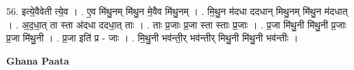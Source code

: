 \documentclass[17pt]{extarticle}
\begin{document}
56. इत्ये॒वैवेती त्ये॒व । . ए॒व मि॑थु॒नम् मि॑थु॒न मे॒वैव मि॑थु॒नम् । . मि॒थु॒न म॑दधा ददधान् मिथु॒नम् मि॑थु॒न म॑दधात् । . अ॒द॒धा॒त् ता स्ता अ॑दधा ददधा॒त् ताः । . ताः प्र॒जाः प्र॒जा स्ता स्ताः प्र॒जाः । . प्र॒जा मि॑थु॒नी मि॑थु॒नी प्र॒जाः प्र॒जा मि॑थु॒नी । . प्र॒जा इति॑ प्र - जाः । . मि॒थु॒नी भव॑न्ती॒र् भव॑न्तीर् मिथु॒नी मि॑थु॒नी भव॑न्तीः । \newline

\textbf{Ghana Paata } \newline
\end{document}

